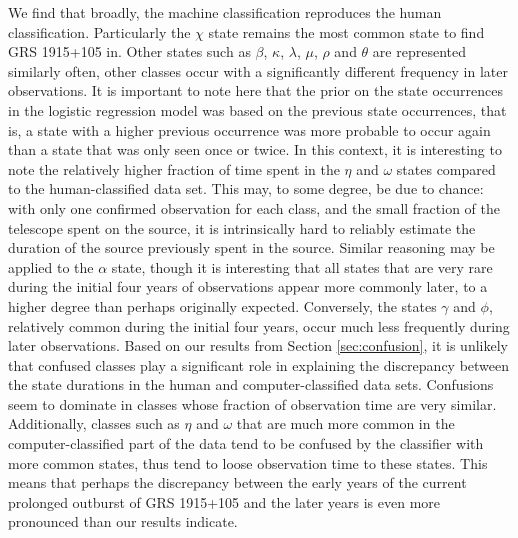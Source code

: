 \documentclass[12pt]{emulateapj}
\begin{document}
We find that broadly, the machine classification reproduces the human classification. Particularly the $\chi$ state remains the most common state to find GRS 1915+105 in. Other states such as $\beta$, $\kappa$, $\lambda$, $\mu$, $\rho$ and $\theta$ are represented similarly often, other classes occur with a significantly different frequency in later observations. It is important to note here that the prior on the state occurrences in the logistic regression model was based on the previous state occurrences, that is, a state with a higher previous occurrence was more probable to occur again than a state that was only seen once or twice. In this context, it is interesting to note the relatively higher fraction of time spent in the $\eta$ and $\omega$ states compared to the human-classified data set.
This may, to some degree, be due to chance: with only one confirmed observation for each class, and the small fraction of the telescope spent on the source, it is intrinsically hard to reliably estimate the duration of the source previously spent in the source. Similar reasoning may be applied to the $\alpha$ state, though it is interesting that all states that are very rare during the initial four years of observations appear more commonly later, to a higher degree than perhaps originally expected. Conversely, the states $\gamma$ and $\phi$, relatively common during the initial four years, occur much less frequently during later observations.
Based on our results from Section \ref{sec:confusion}, it is unlikely that confused classes play a significant role in explaining the discrepancy between the state durations in the human and computer-classified data sets. Confusions seem to dominate in classes whose fraction of observation time are very similar.
Additionally, classes such as $\eta$ and $\omega$ that are much more common in the computer-classified part of the data tend to be confused by the classifier with more common states, thus tend to loose observation time to these states. This means that perhaps the discrepancy between the early years of the current prolonged outburst of GRS 1915+105 and the later years is even more pronounced than our results indicate.
\end{document}
